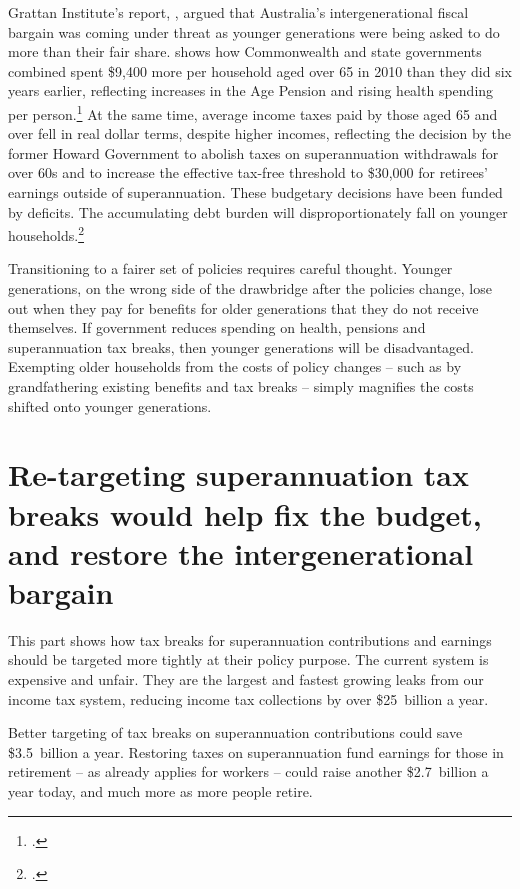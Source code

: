 Grattan Institute’s report, , argued that Australia’s intergenerational fiscal bargain was coming under threat as younger generations were being asked to do more than their fair share.  shows how Commonwealth and state governments combined spent \$9,400 more per household aged over 65 in 2010 than they did six years earlier, reflecting increases in the Age Pension and rising health spending per person.\footcite[][22]{DaleyWoodWeidmannEtAl2014}  At the same time, average income taxes paid by those aged 65 and over fell in real dollar terms, despite higher incomes, reflecting the decision by the former Howard Government to abolish taxes on superannuation withdrawals for over 60s and to increase the effective tax-free threshold to \$30,000 for retirees’ earnings outside of superannuation. These budgetary decisions have been funded by deficits. The accumulating debt burden will disproportionately fall on younger households.\footcite[][29]{DaleyWoodWeidmannEtAl2014}


Transitioning to a fairer set of policies requires careful thought. Younger generations, on the wrong side of the drawbridge after the policies change, lose out when they pay for benefits for older generations that they do not receive themselves. If government reduces spending on health, pensions and superannuation tax breaks, then younger generations will be disadvantaged. Exempting older households from the costs of policy changes – such as by grandfathering existing benefits and tax breaks – simply magnifies the costs shifted onto younger generations. 

\section{Re-targeting superannuation tax breaks would help fix the budget, and restore the intergenerational bargain}
This part shows how tax breaks for superannuation contributions and earnings should be targeted more tightly at their policy purpose. The current system is expensive and unfair. They are the largest and fastest growing leaks from our income tax system, reducing income tax collections by over \$25~billion a year. 

Better targeting of tax breaks on superannuation contributions could save \$3.5~billion a year. Restoring taxes on superannuation fund earnings for those in retirement – as already applies for workers – could raise another \$2.7~billion a year today, and much more as more people retire. 

